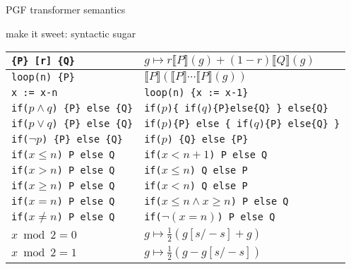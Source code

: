 \documentclass[8pt]{beamer}
\renewcommand{\S}[1]{ \llbracket #1 \rrbracket }
\begin{document}
\begin{frame}[allowframebreaks]{PGF transformer semantics}
	\begin{block}{make it sweet: syntactic sugar}
		\begin{center}
			\begin{tabular}{l|l}
				\hline
				\texttt{\{P\} [r] \{Q\}}                   & \(g\mapsto r\S{P}(g) + (1-r)\S{Q}(g)\)                      \\
				\hline
				\texttt{loop(n) \{P\}}                     & \(\S{P}(\S{P}\cdots \S{P}(g))\)                             \\
				\texttt{x := x-n}                          & \texttt{loop(n) \{x := x-1\}}                               \\
				\hline
				\texttt{if(\(p\land q\)) \{P\} else \{Q\}} & \texttt{if(\(p\))\{ if(\(q\))\{P\}else\{Q\} \} else\{Q\}}   \\
				\texttt{if(\(p\lor q\)) \{P\} else \{Q\}}  & \texttt{if(\(p\))\{P\} else \{ if(\(q\))\{P\} else\{Q\} \}} \\
				\texttt{if(\(\lnot p\)) \{P\} else \{Q\}}  & \texttt{if(\(p\)) \{Q\} else \{P\}}                         \\
				\hline
				\texttt{if(\(x\leq n\))  P else Q}         & \texttt{if(\(x<n+1\)) P else Q}                             \\
				\texttt{if(\(x> n\))     P else Q}         & \texttt{if(\(x\leq n\)) Q else P}                           \\
				\texttt{if(\(x\geq n\))  P else Q}         & \texttt{if(\(x<n\)) Q else P}                               \\
				\texttt{if(\(x =  n\))   P else Q}         & \texttt{if(\(x\leq n \land x \geq n\)) P else Q}            \\
				\texttt{if(\(x \neq n\)) P else Q}         & \texttt{if(\(\lnot (x=n)\)) P else Q}                       \\
				\hline
				\(x \bmod 2 = 0\)                          & \(g\mapsto \frac12(g[s/-s] + g)\)                           \\
				\(x \bmod 2 = 1\)                          & \(g\mapsto \frac12(g - g[s/-s])\)                           \\
				\hline
			\end{tabular}
		\end{center}
	\end{block}
\end{frame}
\end{document}
